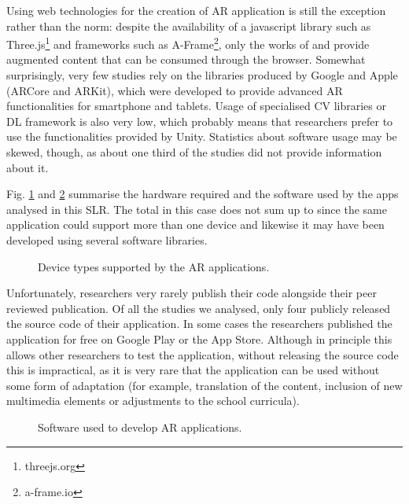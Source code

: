 Using web technologies for the creation of AR application is still the exception rather than the norm: despite the availability of a javascript library such as Three.js\footnote{threejs.org} and frameworks such as A-Frame\footnote{a-frame.io}, only the works of \citet{abriata2020building} and \citet{protopsaltis2016quiz} provide augmented content that can be consumed through the browser.
Somewhat surprisingly, very few studies rely on the libraries produced by Google and Apple (ARCore and ARKit), which were developed to provide advanced \gls{AR} functionalities for smartphone and tablets. Usage of specialised \gls{CV} libraries or \gls{DL} framework is also very low, which probably means that researchers prefer to use the functionalities provided by Unity. Statistics about software usage may be skewed, though, as about one third of the studies did not provide information about it.

Fig. \ref{fig:hardware} and \ref{fig:software} summarise the hardware required and the software used by the apps analysed in this \gls{SLR}. The total in this case does not sum up to \papersSelected since the same application could support more than one device and likewise it may have been developed using several software libraries.

\begin{figure}[ht]	
	\begin{center}
	
	\caption{Device types supported by the AR applications.}
	\label{fig:hardware}
    \end{center}
\end{figure}

Unfortunately, researchers very rarely publish their code alongside their peer reviewed publication. Of all the studies we analysed, only four \citep{mylonas2019educational, laviole2018nectar, ManriqueJuan2017APA, abriata2020building} publicly released the source code of their application. In some cases the researchers published the application for free on Google Play or the App Store. Although in principle this allows other researchers to test the application, without releasing the source code this is impractical, as it is very rare that the application can be used without some form of adaptation (for example, translation of the content, inclusion of new multimedia elements or adjustments to the school curricula).

\begin{figure}[ht]	
	\begin{center}
	
	\caption{Software used to develop AR applications.}
	\label{fig:software}
    \end{center}
\end{figure}